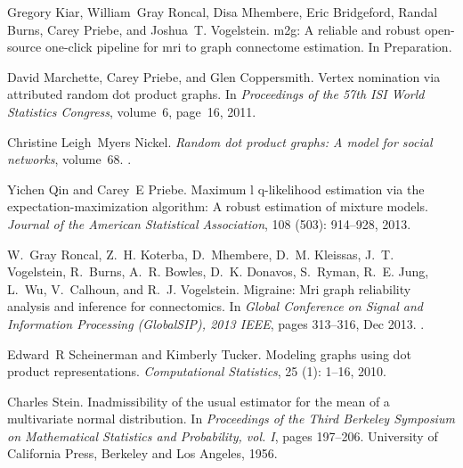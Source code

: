\documentclass[10pt,letterpaper]{article}
\begin{document}
\begin{thebibliography}{10}
Gregory Kiar, William~Gray Roncal, Disa Mhembere, Eric Bridgeford, Randal
  Burns, Carey Priebe, and Joshua~T. Vogelstein.
\newblock m2g: A reliable and robust open-source one-click pipeline for mri to
  graph connectome estimation.
\newblock In Preparation.

David Marchette, Carey Priebe, and Glen Coppersmith.
\newblock Vertex nomination via attributed random dot product graphs.
\newblock In \emph{Proceedings of the 57th ISI World Statistics Congress},
  volume~6, page~16, 2011.

Christine Leigh~Myers Nickel.
\newblock \emph{Random dot product graphs: A model for social networks},
  volume~68.
.


Yichen Qin and Carey~E Priebe.
\newblock Maximum l q-likelihood estimation via the expectation-maximization
  algorithm: A robust estimation of mixture models.
\newblock \emph{Journal of the American Statistical Association}, 108
  (503): 914--928, 2013.

W.~Gray Roncal, Z.~H. Koterba, D.~Mhembere, D.~M. Kleissas, J.~T. Vogelstein,
  R.~Burns, A.~R. Bowles, D.~K. Donavos, S.~Ryman, R.~E. Jung, L.~Wu,
  V.~Calhoun, and R.~J. Vogelstein.
\newblock Migraine: Mri graph reliability analysis and inference for
  connectomics.
\newblock In \emph{Global Conference on Signal and Information Processing
  (GlobalSIP), 2013 IEEE}, pages 313--316, Dec 2013.
\newblock {}.

Edward~R Scheinerman and Kimberly Tucker.
\newblock Modeling graphs using dot product representations.
\newblock \emph{Computational Statistics}, 25 (1): 1--16,
  2010.

Charles Stein.
\newblock Inadmissibility of the usual estimator for the mean of a multivariate
  normal distribution.
\newblock In \emph{Proceedings of the {T}hird {B}erkeley {S}ymposium on
  {M}athematical {S}tatistics and {P}robability, vol. {I}}, pages 197--206.
  University of California Press, Berkeley and Los Angeles, 1956.


\end{thebibliography}
\end{document}
